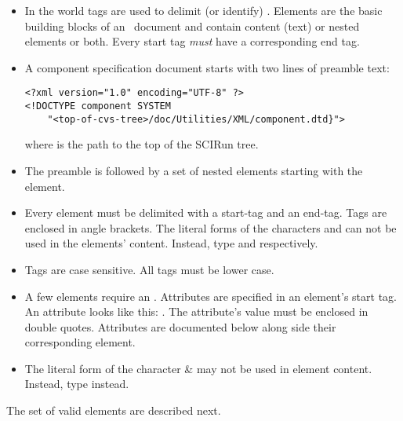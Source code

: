 \documentclass[11pt]{article}
\begin{document}
\begin{itemize}
\item In the \xml{} world tags are used to delimit (or identify)
  .  Elements are the basic building blocks of an \xml\
  document and contain content (text) or nested elements or both.
  Every start tag \emph{must} have a corresponding end tag.
  
\item A component specification document starts with two lines of preamble
  text:

\begin{verbatim}
<?xml version="1.0" encoding="UTF-8" ?>
<!DOCTYPE component SYSTEM 
    "<top-of-cvs-tree>/doc/Utilities/XML/component.dtd}">
\end{verbatim}

  where  is the path to the top of the
  SCIRun \cvs{} tree. 
  
\item The preamble is followed by a set of nested elements starting with
  the \element{component} element.
  
\item Every element must be delimited with a start-tag and an end-tag.
  Tags are enclosed in angle brackets. 
  The literal forms of the characters \keyboard{\la} and
  \keyboard{\ra} can not be used in the elements' content.  Instead, type
  \keyboard{\&lt;} and \keyboard{\&gt;} respectively.

\item Tags are case sensitive. All tags must be lower case.
  
\item A few elements require an .  Attributes are specified
  in an element's start tag.  An attribute looks like this:
  .  The attribute's value
  must be enclosed in double quotes. Attributes are documented below
  along side their corresponding element.
  
\item The literal form of the character \& may not be used in element
  content.  Instead, type \keyboard{\&amp;} instead.

\end{itemize}

The set of valid elements are described next.

\subsection{\SUBSECstructContent}
\label{\SUBSECstructContent}
\end{document}
